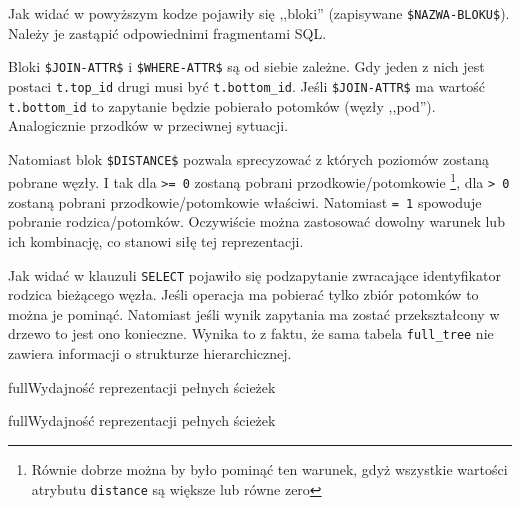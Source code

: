 Jak widać w powyższym kodze pojawiły się ,,bloki'' (zapisywane \verb|$NAZWA-BLOKU$|).
Należy je zastąpić odpowiednimi fragmentami SQL.

Bloki \verb|$JOIN-ATTR$| i \verb|$WHERE-ATTR$| są od siebie zależne.
Gdy jeden z nich jest postaci \verb|t.top_id| drugi musi być \verb|t.bottom_id|.
Jeśli \verb|$JOIN-ATTR$| ma wartość \verb|t.bottom_id| to zapytanie będzie pobierało potomków (węzły ,,pod'').
Analogicznie przodków w przeciwnej sytuacji.

Natomiast blok \verb|$DISTANCE$| pozwala sprecyzować z których poziomów zostaną pobrane węzły.
I tak dla \verb|>= 0| zostaną pobrani przodkowie/potomkowie%
\footnote{Równie dobrze można by było pominąć ten warunek, gdyż wszystkie wartości atrybutu \texttt{distance} są większe lub równe zero},
dla \verb|> 0| zostaną pobrani przodkowie/potomkowie właściwi.
Natomiast \verb|= 1| spowoduje pobranie rodzica/potomków.
Oczywiście można zastosować dowolny warunek lub ich kombinację, co stanowi siłę tej reprezentacji. 









Jak widać w klauzuli \texttt{SELECT} pojawiło się podzapytanie
zwracające identyfikator rodzica bieżącego węzła.
Jeśli operacja ma pobierać tylko zbiór potomków to można je pominąć.
Natomiast jeśli wynik zapytania ma zostać przekształcony w drzewo to jest ono konieczne.
Wynika to z faktu, że sama tabela \verb|full_tree| nie zawiera informacji o strukturze hierarchicznej.

%
%
%



\begin{qxtab}{full}{Wydajność reprezentacji pełnych ścieżek}
\end{qxtab}

\begin{qxfig}{full}{Wydajność reprezentacji pełnych ścieżek}
\end{qxfig}








